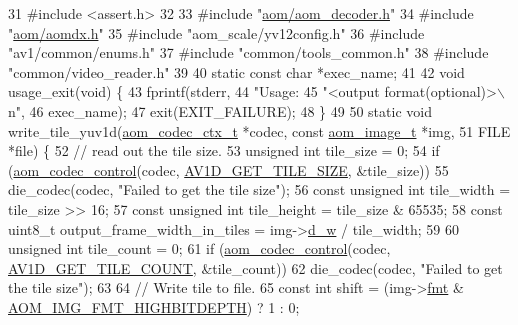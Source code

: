 \begin{DoxyCodeInclude}
31 \textcolor{preprocessor}{#include <assert.h>}
32 
33 \textcolor{preprocessor}{#include "\hyperlink{aom__decoder_8h}{aom/aom\_decoder.h}"}
34 \textcolor{preprocessor}{#include "\hyperlink{aomdx_8h}{aom/aomdx.h}"}
35 \textcolor{preprocessor}{#include "aom\_scale/yv12config.h"}
36 \textcolor{preprocessor}{#include "av1/common/enums.h"}
37 \textcolor{preprocessor}{#include "common/tools\_common.h"}
38 \textcolor{preprocessor}{#include "common/video\_reader.h"}
39 
40 \textcolor{keyword}{static} \textcolor{keyword}{const} \textcolor{keywordtype}{char} *exec\_name;
41 
42 \textcolor{keywordtype}{void} usage\_exit(\textcolor{keywordtype}{void}) \{
43   fprintf(stderr,
44           \textcolor{stringliteral}{"Usage: %
45           \textcolor{stringliteral}{"<output format(optional)>\(\backslash\)n"},
46           exec\_name);
47   exit(EXIT\_FAILURE);
48 \}
49 
50 \textcolor{keyword}{static} \textcolor{keywordtype}{void} write\_tile\_yuv1d(\hyperlink{structaom__codec__ctx}{aom\_codec\_ctx\_t} *codec, \textcolor{keyword}{const} 
      \hyperlink{structaom__image}{aom\_image\_t} *img,
51                              FILE *file) \{
52   \textcolor{comment}{// read out the tile size.}
53   \textcolor{keywordtype}{unsigned} \textcolor{keywordtype}{int} tile\_size = 0;
54   \textcolor{keywordflow}{if} (\hyperlink{group__codec_ga6da974f4eeaba1fa74106b28d0fe6ac5}{aom\_codec\_control}(codec, \hyperlink{group__aom__decoder_gga3865fd4b3192489baa9a5c3632ebe97ba4d9799d9e520785870b8d1f73a19c3c4}{AV1D\_GET\_TILE\_SIZE}, &tile\_size))
55     die\_codec(codec, \textcolor{stringliteral}{"Failed to get the tile size"});
56   \textcolor{keyword}{const} \textcolor{keywordtype}{unsigned} \textcolor{keywordtype}{int} tile\_width = tile\_size >> 16;
57   \textcolor{keyword}{const} \textcolor{keywordtype}{unsigned} \textcolor{keywordtype}{int} tile\_height = tile\_size & 65535;
58   \textcolor{keyword}{const} uint8\_t output\_frame\_width\_in\_tiles = img->\hyperlink{structaom__image_a89f80b1f58d608b9d2080635f4359034}{d\_w} / tile\_width;
59 
60   \textcolor{keywordtype}{unsigned} \textcolor{keywordtype}{int} tile\_count = 0;
61   \textcolor{keywordflow}{if} (\hyperlink{group__codec_ga6da974f4eeaba1fa74106b28d0fe6ac5}{aom\_codec\_control}(codec, \hyperlink{group__aom__decoder_gga3865fd4b3192489baa9a5c3632ebe97ba242d7dba47ef646f51f9795e2fa92f91}{AV1D\_GET\_TILE\_COUNT}, &tile\_count))
62     die\_codec(codec, \textcolor{stringliteral}{"Failed to get the tile size"});
63 
64   \textcolor{comment}{// Write tile to file.}
65   \textcolor{keyword}{const} \textcolor{keywordtype}{int} shift = (img->\hyperlink{structaom__image_a6c64b1ab918d80d52eb8f5d6d957e825}{fmt} & \hyperlink{aom__image_8h_a607b37d91f75442f54223ecd85f1b6cb}{AOM\_IMG\_FMT\_HIGHBITDEPTH}) ? 1 : 0;
}
\end{DoxyCodeInclude}
